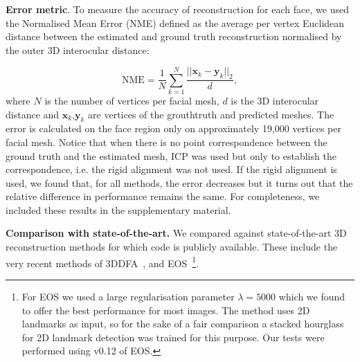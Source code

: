 \textbf{Error metric}. To measure the accuracy of reconstruction for each face, we used the Normalised Mean Error (NME) defined as the average per vertex Euclidean distance between the estimated and ground truth reconstruction normalised by the outer 3D interocular distance:

\begin{equation}
\textrm{NME} = \frac{1}{N} \sum_{k=1}^{N} \frac{||\mathbf{x}_k-\mathbf{y}_{k} ||_{2} }{d}, \label{eq:err}
\end{equation}
where $N$ is the number of vertices per facial mesh, $d$ is the 3D
interocular distance and $\mathbf{x}_k$,$\mathbf{y}_k$ are vertices of the grouthtruth and predicted meshes. The error is calculated on the face region only
on approximately 19,000 vertices per facial mesh. Notice that when
there is no point correspondence between the ground truth and the
estimated mesh, ICP was used but only to establish the
correspondence, i.e. the rigid alignment was not used. If the rigid
alignment is used, we found that, for all methods, the error decreases
but it turns out that the relative difference in performance remains
the same. For completeness, we included these results in the
supplementary material.

\textbf{Comparison with
  state-of-the-art.} We compared against state-of-the-art 3D
reconstruction methods for which code is publicly available. These include the very recent methods of 3DDFA~\cite{zhu2016face},  and EOS~\cite{huber2016multiresolution}\footnote{For EOS we used
  a large regularisation parameter $\lambda = 5000$ which we found to
  offer the best performance for most images. The method uses 2D landmarks as input, so for the
  sake of a fair comparison a stacked hourglass for 2D landmark
  detection was trained for this purpose. Our tests were performed
  using v0.12 of EOS.}. %










